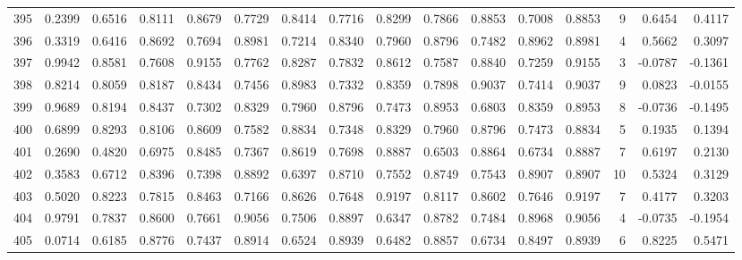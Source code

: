 \begin{tabular}{lrrrrrrrrrrrrrrr}
395 &      0.2399 &  0.6516 &  0.8111 &  0.8679 &  0.7729 &  0.8414 &  0.7716 &  0.8299 &  0.7866 &  0.8853 &   0.7008 &     0.8853 &      9 &                    0.6454 &                     0.4117 \\
396 &      0.3319 &  0.6416 &  0.8692 &  0.7694 &  0.8981 &  0.7214 &  0.8340 &  0.7960 &  0.8796 &  0.7482 &   0.8962 &     0.8981 &      4 &                    0.5662 &                     0.3097 \\
397 &      0.9942 &  0.8581 &  0.7608 &  0.9155 &  0.7762 &  0.8287 &  0.7832 &  0.8612 &  0.7587 &  0.8840 &   0.7259 &     0.9155 &      3 &                   -0.0787 &                    -0.1361 \\
398 &      0.8214 &  0.8059 &  0.8187 &  0.8434 &  0.7456 &  0.8983 &  0.7332 &  0.8359 &  0.7898 &  0.9037 &   0.7414 &     0.9037 &      9 &                    0.0823 &                    -0.0155 \\
399 &      0.9689 &  0.8194 &  0.8437 &  0.7302 &  0.8329 &  0.7960 &  0.8796 &  0.7473 &  0.8953 &  0.6803 &   0.8359 &     0.8953 &      8 &                   -0.0736 &                    -0.1495 \\
400 &      0.6899 &  0.8293 &  0.8106 &  0.8609 &  0.7582 &  0.8834 &  0.7348 &  0.8329 &  0.7960 &  0.8796 &   0.7473 &     0.8834 &      5 &                    0.1935 &                     0.1394 \\
401 &      0.2690 &  0.4820 &  0.6975 &  0.8485 &  0.7367 &  0.8619 &  0.7698 &  0.8887 &  0.6503 &  0.8864 &   0.6734 &     0.8887 &      7 &                    0.6197 &                     0.2130 \\
402 &      0.3583 &  0.6712 &  0.8396 &  0.7398 &  0.8892 &  0.6397 &  0.8710 &  0.7552 &  0.8749 &  0.7543 &   0.8907 &     0.8907 &     10 &                    0.5324 &                     0.3129 \\
403 &      0.5020 &  0.8223 &  0.7815 &  0.8463 &  0.7166 &  0.8626 &  0.7648 &  0.9197 &  0.8117 &  0.8602 &   0.7646 &     0.9197 &      7 &                    0.4177 &                     0.3203 \\
404 &      0.9791 &  0.7837 &  0.8600 &  0.7661 &  0.9056 &  0.7506 &  0.8897 &  0.6347 &  0.8782 &  0.7484 &   0.8968 &     0.9056 &      4 &                   -0.0735 &                    -0.1954 \\
405 &      0.0714 &  0.6185 &  0.8776 &  0.7437 &  0.8914 &  0.6524 &  0.8939 &  0.6482 &  0.8857 &  0.6734 &   0.8497 &     0.8939 &      6 &                    0.8225 &                     0.5471 \\

\end{tabular}

